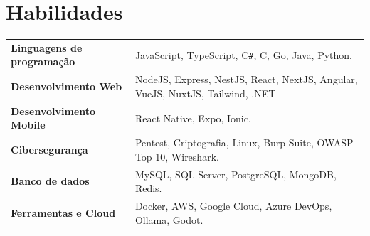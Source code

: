 \documentclass[a4paper,12pt]{article}
\begin{document}
\section{Habilidades}
\begin{tabularx}{\linewidth}{@{}l X@{}}
\textbf{Linguagens de programação} & \normalsize{JavaScript, TypeScript, C{\texttt{\#}}, C, Go, Java, Python.}\\
\textbf{Desenvolvimento Web} & \normalsize{NodeJS, Express, NestJS, React, NextJS, Angular, VueJS, NuxtJS, Tailwind, .NET}\\
\textbf{Desenvolvimento Mobile} & \normalsize{React Native, Expo, Ionic.}\\
\textbf{Cibersegurança} & \normalsize{Pentest, Criptografia, Linux, Burp Suite, OWASP Top 10, Wireshark.}\\
\textbf{Banco de dados}  &  \normalsize{MySQL, SQL Server, PostgreSQL, MongoDB, Redis.}\\
\textbf{Ferramentas e Cloud}  &  \normalsize{Docker, AWS, Google Cloud, Azure DevOps, Ollama, Godot.}\\  
\end{tabularx}

\vfill
{}
\end{document}
